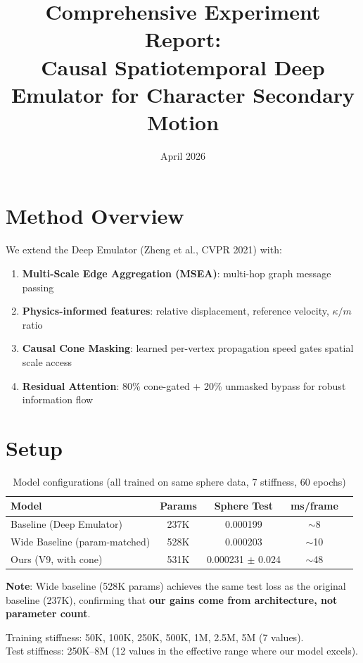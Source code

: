 \documentclass[10pt]{article}
\title{Comprehensive Experiment Report:\\Causal Spatiotemporal Deep Emulator for Character Secondary Motion}
\author{}
\date{April 2026}
\begin{document}
\maketitle

\section{Method Overview}

We extend the Deep Emulator (Zheng et al., CVPR 2021) with:
\begin{enumerate}
\item \textbf{Multi-Scale Edge Aggregation (MSEA)}: multi-hop graph message passing
\item \textbf{Physics-informed features}: relative displacement, reference velocity, $\kappa/m$ ratio
\item \textbf{Causal Cone Masking}: learned per-vertex propagation speed gates spatial scale access
\item \textbf{Residual Attention}: 80\% cone-gated + 20\% unmasked bypass for robust information flow
\end{enumerate}

\section{Setup}

\begin{table}[h]
\centering
\caption{Model configurations (all trained on same sphere data, 7 stiffness, 60 epochs)}
\small
\begin{tabular}{lcccc}
\toprule
\textbf{Model} & \textbf{Params} & \textbf{Sphere Test} & \textbf{ms/frame} \\
\midrule
Baseline (Deep Emulator) & 237K & 0.000199 & $\sim$8 \\
Wide Baseline (param-matched) & 528K & 0.000203 & $\sim$10 \\
Ours (V9, with cone) & 531K & 0.000231 $\pm$ 0.024 & $\sim$48 \\
\bottomrule
\end{tabular}
\end{table}

\textbf{Note}: Wide baseline (528K params) achieves the same test loss as the original baseline (237K), confirming that \textbf{our gains come from architecture, not parameter count}.

Training stiffness: 50K, 100K, 250K, 500K, 1M, 2.5M, 5M (7 values).\\
Test stiffness: 250K--8M (12 values in the effective range where our model excels).
\end{document}
